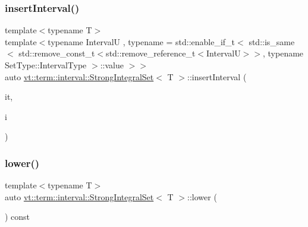 \subsubsection{\texorpdfstring{insert\+Interval()}{insertInterval()}\hspace{0.1cm}{\footnotesize\ttfamily [2/2]}}
{\footnotesize\ttfamily template$<$typename T$>$ \\
template$<$typename IntervalU , typename  = std\+::enable\+\_\+if\+\_\+t$<$      std\+::is\+\_\+same$<$        std\+::remove\+\_\+const\+\_\+t$<$std\+::remove\+\_\+reference\+\_\+t$<$\+Interval\+U$>$$>$,        typename Set\+Type\+::\+Interval\+Type      $>$\+::value    $>$$>$ \\
auto \hyperlink{structvt_1_1term_1_1interval_1_1_strong_integral_set}{vt\+::term\+::interval\+::\+Strong\+Integral\+Set}$<$ T $>$\+::insert\+Interval (\begin{DoxyParamCaption}\item[{typename \hyperlink{structvt_1_1term_1_1interval_1_1_integral_set_base_a111b2ec1ea960a40ba4270be702f11f1}{Set\+Type\+::\+Iterator\+Type}}]{it,  }\item[{IntervalU \&\&}]{i }\end{DoxyParamCaption})\hspace{0.3cm}{\ttfamily [inline]}}

\mbox{\label{structvt_1_1term_1_1interval_1_1_strong_integral_set_a640d829d912ce07095ad70206b9a87ba}} 
\subsubsection{\texorpdfstring{lower()}{lower()}}
{\footnotesize\ttfamily template$<$typename T$>$ \\
auto \hyperlink{structvt_1_1term_1_1interval_1_1_strong_integral_set}{vt\+::term\+::interval\+::\+Strong\+Integral\+Set}$<$ T $>$\+::lower (\begin{DoxyParamCaption}{ }\end{DoxyParamCaption}) const\hspace{0.3cm}{\ttfamily [inline]}}

\mbox{\label{structvt_1_1term_1_1interval_1_1_strong_integral_set_ab0fc4f9f1f9d687b7d0b7308a4a856da}} 
